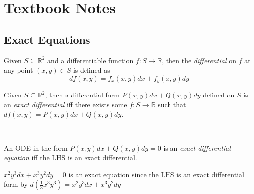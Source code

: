 \documentclass[notes]{subfiles}
\begin{document}
\setcounter{section}{3}
\section{Textbook Notes}
\subsection{Exact Equations}

\begin{definition}
    Given $S \subseteq \mathbb{R}^2$ and a differentiable function $f\colon S \to \mathbb{R}$, then the \textit{differential} on $f$ at any point $(x, y) \in S$ is defined as
    \[
        df(x, y) = f_x(x, y)dx + f_y(x, y)dy
    \]
\end{definition}

\begin{definition}
    Given $S \subseteq \mathbb{R}^2$, then a differential form $P(x, y)dx + Q(x, y)dy$ defined on $S$ is an \textit{exact differential} iff there exists some $f\colon S \to \mathbb{R}$ such that $df(x, y) = P(x, y)dx + Q(x, y)dy$.
\end{definition}

\begin{definition} ~\par
    An ODE in the form $P(x, y)dx + Q(x, y)dy = 0$ is an \textit{exact differential equation} iff the LHS is an exact differential.
\end{definition}

\begin{example}
    $x^2 y^3 dx + x^3 y^2 dy = 0$ is an exact equation since the LHS is an exact differential form by $d\left(\frac{1}{3}x^3 y^3\right) = x^2 y^3 dx + x^3 y^2 dy$
\end{example}
\end{document}
